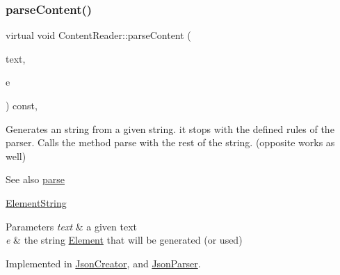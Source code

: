 \mbox{\label{classContentReader_a310678ddc37a05aca2f13db73b22abe5}} 
\subsubsection{\texorpdfstring{parse\+Content()}{parseContent()}\hspace{0.1cm}{\footnotesize\ttfamily [2/6]}}
{\footnotesize\ttfamily virtual void Content\+Reader\+::parse\+Content (\begin{DoxyParamCaption}\item[{std\+::string \&}]{text,  }\item[{\mbox{\hyperlink{classElementString}{Element\+String}} $\ast$}]{e }\end{DoxyParamCaption}) const\hspace{0.3cm}{\ttfamily [pure virtual]}, {\ttfamily [inherited]}}

Generates an string from a given string. it stops with the defined rules of the parser. Calls the method parse with the rest of the string. (opposite works as well) \begin{DoxySeeAlso}{See also}
\mbox{\hyperlink{classContentReader_a7fff2e63a2e8fa216665604f69974e1d}{parse}} 

\mbox{\hyperlink{classElementString}{Element\+String}}
\end{DoxySeeAlso}

\begin{DoxyParams}{Parameters}
{\em text} & a given text \\
\hline
{\em e} & the string \mbox{\hyperlink{classElement}{Element}} that will be generated (or used) \\
\hline
\end{DoxyParams}


Implemented in \mbox{\hyperlink{classJsonCreator_acf8d7cd3dcbb669fd9eb5dec95e069f3}{Json\+Creator}}, and \mbox{\hyperlink{classJsonParser_a94737a7518f05e4ed43a753f4148b354}{Json\+Parser}}.

\mbox{\label{classContentReader_a3ee0aec579c723f17742e10fe7c75e39}} 

